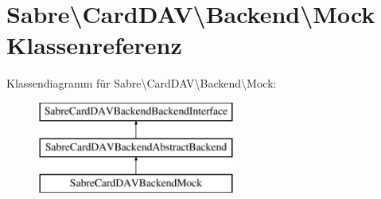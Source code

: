 \hypertarget{class_sabre_1_1_card_d_a_v_1_1_backend_1_1_mock}{}\section{Sabre\textbackslash{}Card\+D\+AV\textbackslash{}Backend\textbackslash{}Mock Klassenreferenz}
\label{class_sabre_1_1_card_d_a_v_1_1_backend_1_1_mock}
Klassendiagramm für Sabre\textbackslash{}Card\+D\+AV\textbackslash{}Backend\textbackslash{}Mock\+:\begin{figure}[H]
\begin{center}
\leavevmode
\includegraphics[height=3.000000cm]{class_sabre_1_1_card_d_a_v_1_1_backend_1_1_mock}
\end{center}
\end{figure}
